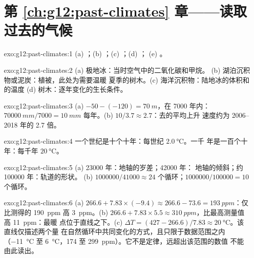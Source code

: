 \section*{第 \ref{ch:g12:past-climates} 章——读取过去的气候}

\begin{solution}{exo:g12:past-climates:1}
(a) ；(b) ；(c) ；(d) ；
(e) 。
\end{solution}

\begin{solution}{exo:g12:past-climates:2}
(a) 极地冰：当时空气中的二氧化碳和甲烷。
(b) 湖泊沉积物或泥炭：植被，此处为需要温暖
夏季的树木。(c) 海洋沉积物：陆地冰的体积和的温度
(d) 树木：逐年变化的生长条件。
\end{solution}

\begin{solution}{exo:g12:past-climates:3}
(a) $-50 - (-120) = \qty{70}{m}$，在 \num{7000} 年内：$\qty{70000}{mm}/\num{7000}
= \qty{10}{mm}$ 每年。(b) $10/3.7 \approx 2.7$：去的平均上升
速度约为 2006--2018 年的 2.7 倍。
\end{solution}

\begin{solution}{exo:g12:past-climates:4}
一个世纪是十个十年：每世纪 $\qty{2.0}{\degreeCelsius}$。一千
年是一百个十年：每千年 $\qty{20}{\degreeCelsius}$。
\end{solution}

\begin{solution}{exo:g12:past-climates:5}
(a) \num{23000} 年：地轴的岁差；\num{42000} 年：
地轴的倾斜；约 \num{100000} 年：轨道的形状。
(b) $\num{1000000}/\num{41000} \approx 24$ 个循环；$\num{1000000}/\num{100000}
= 10$ 个循环。
\end{solution}

\begin{solution}{exo:g12:past-climates:6}
(a) $266.6 + 7.83 \times (-9.4) \approx 266.6 - 73.6 = \qty{193}{ppm}$：仅
比测得的 \qty{190}{ppm} 高 \qty{3}{ppm}。(b) $266.6 + 7.83 \times 5.5
\approx \qty{310}{ppm}$，比最高测量值高 \qty{11}{ppm}：最暖
点位于直线之下。(c) $\Delta T = (427 - 266.6)/7.83 \approx
\qty{20}{\degreeCelsius}$。该直线仅描述两个量
在自然循环中共同变化的方式，且只限于数据范围之内
（\qty{-11}{\degreeCelsius} 至 \qty{+6}{\degreeCelsius}，174 至
\qty{299}{ppm}）。它不是定律，远超出该范围的数值
不能由此读出。
\end{solution}

